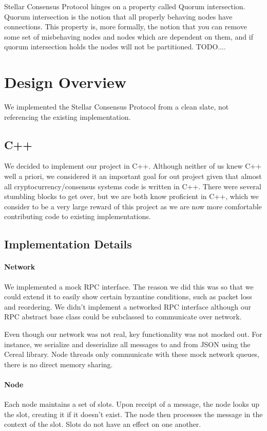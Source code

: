 \documentclass[preprint,11pt]{article} \usepackage{amsmath}
\begin{document}
Stellar Consensus Protocol hinges on a property called Quorum
intersection.  Quorum intersection is the notion that all properly
behaving nodes have connections.  This property is, more formally, the
notion that you can remove some set of misbehaving nodes and nodes
which are dependent on them, and if quorum intersection holds the
nodes will not be partitioned. TODO....



\section{Design Overview}
We implemented the Stellar Consensus Protocol from a clean slate, not
referencing the existing implementation.
\subsection{C++}
We decided to implement our project in C++. Although neither of us
knew C++ well a priori, we considered it an important goal for out
project given that almost all cryptocurrency/consensus systems code is
written in C++. There were several stumbling blocks to get over, but
we are both know proficient in C++, which we consider to be a very
large reward of this project as we are now more comfortable
contributing code to existing implementations.
\subsection{Implementation Details}
\paragraph{Network}
We implemented a mock RPC interface. The reason we did this was so
that we could extend it to easily show certain byzantine conditions,
such as packet loss and reordering. We didn't implement a networked
RPC interface although our RPC abstract base class could be subclassed
to communicate over network.

Even though our network was not real, key functionality was not mocked
out.  For instance, we serialize and deserialize all messages to and
from JSON using the Cereal library. Node threads only communicate with
these mock network queues, there is no direct memory sharing.

\paragraph{Node}
Each node maintains a set of slots. Upon receipt of a message, the
node looks up the slot, creating it if it doesn't exist.  The node
then processes the message in the context of the slot. Slots do not
have an effect on one another.
\end{document}
